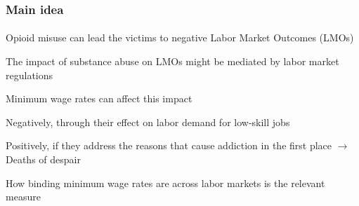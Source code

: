 \begin{frame}

    \label{main_idea}
    \frametitle{Main idea} %
    \framesubtitle{}  %
    \rmfamily %
    
    \begin{wideitemize}
        \item Opioid misuse can lead the victims to negative Labor Market Outcomes (\textcolor{fblu}{LMOs})
        \item The impact of substance abuse on LMOs might be mediated by labor market regulations
        \item \textcolor{fblu}{Minimum wage rates} can affect this impact 
        \vspace{9pt}
        \begin{wideitemize}
            \item[\textcolor{fblu}{\textbullet}] Negatively, through their effect on \textcolor{fblu}{labor demand for low-skill jobs} 
            \item[\textcolor{fblu}{\textbullet}] Positively, if they address the reasons that cause \textcolor{fblu}{addiction} in the first place \(\to\) \textcolor{fblu}{Deaths of despair}
        \end{wideitemize}
        \item How \textcolor{fblu}{binding} minimum wage rates are across labor markets is the relevant measure
    \end{wideitemize}

    \hyperlink{min_wage_plot}{}
    \hyperlink{min_wage_plot_allstates}{}

\end{frame}

